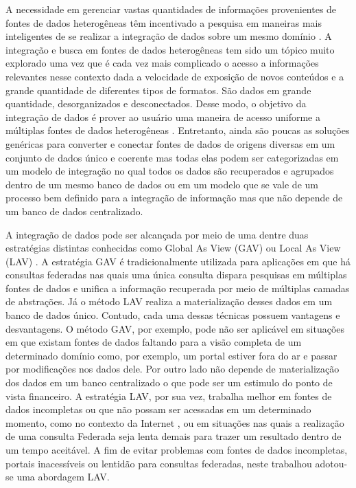 A necessidade em gerenciar vastas quantidades de informações provenientes de fontes de dados heterogêneas têm incentivado a pesquisa em maneiras mais inteligentes de se realizar a integração de dados sobre um mesmo domínio \citep{Wang, Vettor2014}.
A integração e busca em fontes de dados heterogêneas tem sido um tópico muito explorado uma vez que é cada vez mais complicado o acesso a informações relevantes nesse contexto dada a velocidade de exposição de novos conteúdos e a grande quantidade de diferentes tipos de formatos. São dados em grande quantidade, desorganizados e desconectados. Desse modo, o objetivo da integração de dados é prover ao usuário uma maneira de acesso uniforme a múltiplas fontes de dados heterogêneas \citep{Wang}. Entretanto, ainda são poucas as soluções genéricas para converter e conectar fontes de dados de origens diversas em um conjunto de dados único e coerente mas todas elas podem ser categorizadas em um modelo de integração no qual todos os dados são recuperados e agrupados dentro de um mesmo banco de dados ou em um modelo que se vale de um processo bem definido para a integração de informação mas que não depende de um banco de dados centralizado.

A integração de dados pode ser alcançada por meio de uma dentre duas estratégias distintas conhecidas como Global As View (GAV) ou Local As View (LAV) \citep{Abdellaoui2015, Wang2017, Putra2017}. A estratégia GAV é tradicionalmente utilizada para aplicações em que há consultas federadas nas quais uma única consulta dispara pesquisas em múltiplas fontes de dados e unifica a informação recuperada por meio de múltiplas camadas de abstrações. Já o método LAV realiza a materialização desses dados em um banco de dados único. Contudo, cada uma dessas técnicas possuem vantagens e desvantagens. O método GAV, por exemplo, pode não ser aplicável em situações em que existam fontes de dados faltando para a visão completa de um determinado domínio como, por exemplo, um portal estiver fora do ar e passar por modificações nos dados dele. Por outro lado não depende de materialização dos dados em um banco centralizado o que pode ser um estimulo do ponto de vista financeiro\citep{Putra2017}. A estratégia LAV, por sua vez, trabalha melhor em fontes de dados incompletas ou que não possam ser acessadas em um determinado momento, como no contexto da Internet \citep{Putra2017}, ou em situações nas quais a realização de uma consulta Federada seja lenta demais para trazer um resultado dentro de um tempo aceitável. A fim de evitar problemas com fontes de dados incompletas, portais inacessíveis ou lentidão para consultas federadas, neste trabalhou adotou-se uma abordagem LAV.

